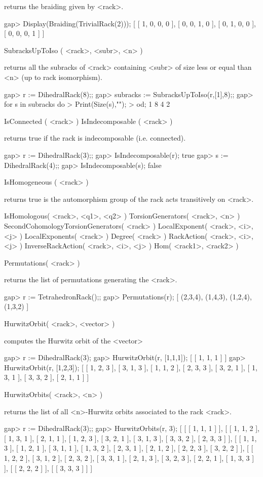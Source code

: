 returns the braiding given by <rack>.

\beginexample
gap> Display(Braiding(TrivialRack(2)));  
[ [  1,  0,  0,  0 ],
  [  0,  0,  1,  0 ],
  [  0,  1,  0,  0 ],
  [  0,  0,  0,  1 ] ]
\endexample

\>SubracksUpToIso ( <rack>, <subr>, <n> )

returns all the subracks of <rack> containing <subr> of size less or equal than
<n> (up to rack isomorphism).

\beginexample
gap> r := DihedralRack(8);;
gap> subracks := SubracksUpToIso(r,[1],8);;
gap> for s in subracks do
> Print(Size(s),"\n");
> od;
1
8
4
2
\endexample

\>IsConnected ( <rack> )
\>IsIndecomposable ( <rack> )

returns true if the rack is indecomposable (i.e. connected).

\beginexample
gap> r := DihedralRack(3);;
gap> IsIndecomposable(r);
true
gap> s := DihedralRack(4);;
gap> IsIndecomposable(s);
false
\endexample

\>IsHomogeneous ( <rack> )

returns true is the automorphism group of the rack acts transitively on <rack>.

\>IsHomologous( <rack>, <q1>, <q2> )
\>TorsionGenerators( <rack>, <n> )
\>SecondCohomologyTorsionGenerators( <rack> )
\>LocalExponent( <rack>, <i>, <j> )
\>LocalExponents( <rack> )
\>Degree( <rack> )
\>RackAction( <rack>, <i>, <j> )
\>InverseRackAction( <rack>, <i>, <j> )
\>Hom( <rack1>, <rack2> )

\>Permutations( <rack> )

returns the list of permutations generating the <rack>.

\beginexample
gap> r := TetrahedronRack();;
gap> Permutations(r);
[ (2,3,4), (1,4,3), (1,2,4), (1,3,2) ]
\endexample

\>HurwitzOrbit( <rack>, <vector> )

computes the Hurwitz orbit of the <vector>

\beginexample
gap> r := DihedralRack(3);   
gap> HurwitzOrbit(r, [1,1,1]); 
[ [ 1, 1, 1 ] ]
gap> HurwitzOrbit(r, [1,2,3]);
[ [ 1, 2, 3 ], [ 3, 1, 3 ], [ 1, 1, 2 ], [ 2, 3, 3 ], [ 3, 2, 1 ], [ 1, 3, 1 ], [ 3, 3, 2 ], [ 2, 1, 1 ] ]
\endexample 

\>HurwitzOrbits( <rack>, <n> )

returns the list of all <n>-Hurwitz orbits associated to the rack <rack>.

\beginexample
gap> r := DihedralRack(3);;
gap> HurwitzOrbits(r, 3);
[ [ [ 1, 1, 1 ] ], [ [ 1, 1, 2 ], [ 1, 3, 1 ], [ 2, 1, 1 ], [ 1, 2, 3 ], [ 3, 2, 1 ], [ 3, 1, 3 ], [ 3, 3, 2 ], 
      [ 2, 3, 3 ] ], [ [ 1, 1, 3 ], [ 1, 2, 1 ], [ 3, 1, 1 ], [ 1, 3, 2 ], [ 2, 3, 1 ], [ 2, 1, 2 ], [ 2, 2, 3 ], 
      [ 3, 2, 2 ] ], [ [ 1, 2, 2 ], [ 3, 1, 2 ], [ 2, 3, 2 ], [ 3, 3, 1 ], [ 2, 1, 3 ], [ 3, 2, 3 ], [ 2, 2, 1 ], 
      [ 1, 3, 3 ] ], [ [ 2, 2, 2 ] ], [ [ 3, 3, 3 ] ] ]
\endexample

